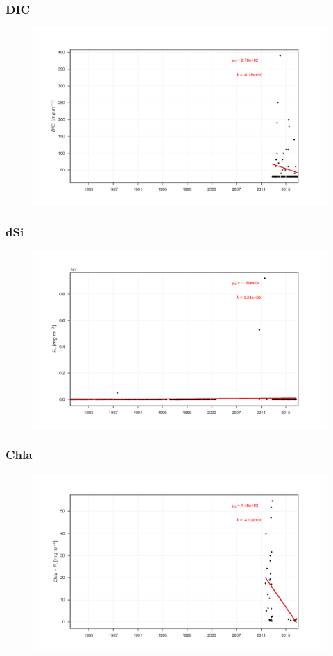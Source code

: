 \documentclass{beamer}
\begin{document}
\begin{frame}
\frametitle{DIC}
\begin{figure}
\includegraphics[width=\textwidth]{rivers/all/all_years/DIC.png}
\end{figure}
\end{frame}

\begin{frame}
\frametitle{dSi}
\begin{figure}
\includegraphics[width=\textwidth]{rivers/all/all_years/dSi.png}
\end{figure}
\end{frame}

\begin{frame}
\frametitle{Chla}
\begin{figure}
\includegraphics[width=\textwidth]{rivers/all/all_years/Chla.png}
\end{figure}
\end{frame}
\end{document}
